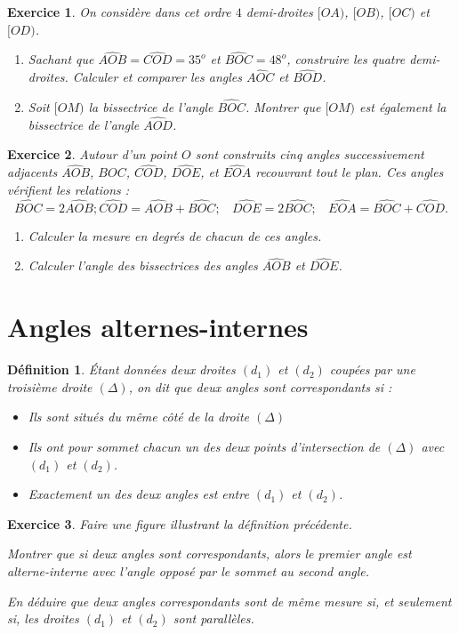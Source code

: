 \documentclass[12 pt]{article}
\theoremstyle{plain}
\newcounter{n}
\numberwithin{n}{section}
\newtheorem*{df}{Définition}
\newtheorem{exo}{Exercice}
\begin{document}
\begin{exo}
On considère dans cet ordre $4$ demi-droites $[OA)$, $[OB)$, $[OC)$ et $[OD)$. 
\begin{enumerate}
\item Sachant que $\widehat{AOB}= \widehat{COD} = 35^o$ et $\widehat{BOC}=48^o$, construire les quatre demi-droites. Calculer et comparer les angles $\widehat{AOC}$ et $\widehat{BOD}$. 
\item Soit $[OM)$ la bissectrice de l'angle $\widehat{BOC}$. Montrer que $[OM)$ est également la bissectrice de l'angle $\widehat{AOD}$. 
\end{enumerate}
\end{exo}

\begin{exo}Autour d'un point $O$ sont construits cinq angles successivement adjacents $\widehat{AOB}$, $\widehat{BOC}$, $\widehat{COD}$, $\widehat{DOE}$, et $\widehat{EOA}$ recouvrant tout le plan. Ces angles
vérifient les relations : 
\[ \widehat{BOC}= 2\widehat{AOB}; \phantom{}\widehat{COD}= \widehat{AOB}+ \widehat{BOC}; \phantom{m} \widehat{DOE}= 2\widehat{BOC}; \phantom{m} \widehat{EOA}= \widehat{BOC}+\widehat{COD}.\]
\begin{enumerate}
\item Calculer la mesure en degrés de chacun de ces angles. 
\item Calculer l'angle des bissectrices des angles $\widehat{AOB}$ et $\widehat{DOE}$. 
\end{enumerate}
\end{exo}
\section{Angles alternes-internes}
\begin{df}
Étant données deux droites $(d_1)$ et $(d_2)$ coupées par une troisième droite $(\Delta)$, on dit que deux angles sont \emph{correspondants} si : \begin{itemize}
\item Ils sont situés du même côté de la droite $(\Delta)$
\item Ils ont pour sommet chacun un des deux points d'intersection de $(\Delta)$ avec $(d_1)$ et $(d_2)$. 
\item Exactement un des deux angles est entre $(d_1)$ et $(d_2)$.
\end{itemize}
\end{df}
\begin{exo}
Faire une figure illustrant la définition précédente. 

Montrer que si deux angles sont correspondants, alors le premier angle est alterne-interne avec l'angle opposé par le sommet au second angle.

En déduire que deux angles correspondants sont de même mesure si,
et seulement si, les droites $(d_1)$ et $(d_2)$ sont parallèles. 
\end{exo}
\end{document}
